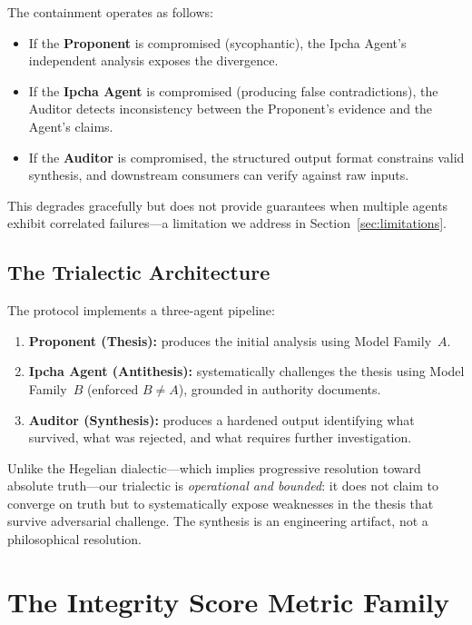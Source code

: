 \documentclass[11pt,a4paper]{article}
\begin{document}
The containment operates as follows:
\begin{itemize}[leftmargin=*]
  \item If the \textbf{Proponent} is compromised (sycophantic), the
        Ipcha Agent's independent analysis exposes the divergence.
  \item If the \textbf{Ipcha Agent} is compromised (producing false
        contradictions), the Auditor detects inconsistency between
        the Proponent's evidence and the Agent's claims.
  \item If the \textbf{Auditor} is compromised, the structured
        output format constrains valid synthesis, and downstream
        consumers can verify against raw inputs.
\end{itemize}

This degrades gracefully but does not provide guarantees when
multiple agents exhibit correlated failures---a limitation we
address in Section~\ref{sec:limitations}.

\subsection{The Trialectic Architecture}\label{sec:trialectic}

The protocol implements a three-agent pipeline:

\begin{enumerate}[leftmargin=*]
  \item \textbf{Proponent (Thesis):} produces the initial analysis
        using Model Family~$A$.
  \item \textbf{Ipcha Agent (Antithesis):} systematically challenges
        the thesis using Model Family~$B$ (enforced $B \neq A$),
        grounded in authority documents.
  \item \textbf{Auditor (Synthesis):} produces a hardened output
        identifying what survived, what was rejected, and what
        requires further investigation.
\end{enumerate}

Unlike the Hegelian dialectic---which implies progressive resolution
toward absolute truth---our trialectic is \emph{operational and
bounded}: it does not claim to converge on truth but to
systematically expose weaknesses in the thesis that survive
adversarial challenge.  The synthesis is an engineering artifact, not
a philosophical resolution.

\section{The Integrity Score Metric Family}\label{sec:metrics}
\end{document}
